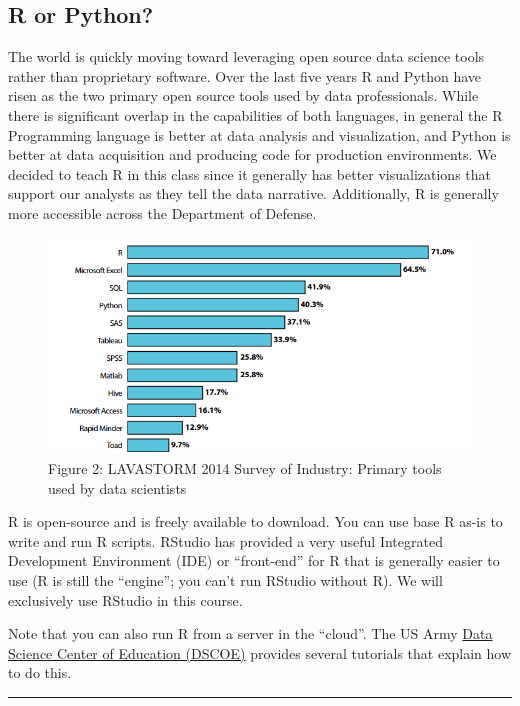 \documentclass[]{book}
\begin{document}
\subsection{R or Python?}\label{r-or-python}

The world is quickly moving toward leveraging open source data science
tools rather than proprietary software. Over the last five years R and
Python have risen as the two primary open source tools used by data
professionals. While there is significant overlap in the capabilities of
both languages, in general the R Programming language is better at data
analysis and visualization, and Python is better at data acquisition and
producing code for production environments. We decided to teach R in
this class since it generally has better visualizations that support our
analysts as they tell the data narrative. Additionally, R is generally
more accessible across the Department of Defense.

\begin{figure}[htbp]
\centering
\includegraphics{whyR2.PNG}
\caption{Figure 2: LAVASTORM 2014 Survey of Industry: Primary tools used
by data scientists}
\end{figure}

R is open-source and is freely available to download. You can use base R
as-is to write and run R scripts. RStudio has provided a very useful
Integrated Development Environment (IDE) or ``front-end'' for R that is
generally easier to use (R is still the ``engine''; you can't run
RStudio without R). We will exclusively use RStudio in this course.

Note that you can also run R from a server in the ``cloud''. The US Army
\href{https://dscoe.army.mil/}{Data Science Center of Education (DSCOE)}
provides several tutorials that explain how to do this.

\begin{center}\rule{0.5\linewidth}{\linethickness}\end{center}
\end{document}
